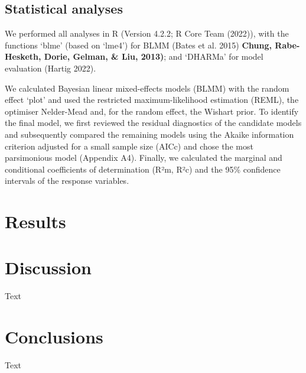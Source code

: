 \documentclass[
]{article}
\begin{document}
\hypertarget{statistical-analyses}{%
\subsection*{Statistical analyses}\label{statistical-analyses}}

We performed all analyses in R (Version 4.2.2; R Core Team (2022)), with the functions `blme' (based on `lme4') for BLMM (Bates et al. 2015) \textbf{Chung, Rabe-Hesketh, Dorie, Gelman, \& Liu, 2013)}; and `DHARMa' for model evaluation (Hartig 2022).

We calculated Bayesian linear mixed-effects models (BLMM) with the random effect `plot' and used the restricted maximum-likelihood estimation (REML), the optimiser Nelder-Mead and, for the random effect, the Wishart prior. To identify the final model, we first reviewed the residual diagnostics of the candidate models and subsequently compared the remaining models using the Akaike information criterion adjusted for a small sample size (AICc) and chose the most parsimonious model (Appendix A4). Finally, we calculated the marginal and conditional coefficients of determination (R²m, R²c) and the 95\% confidence intervals of the response variables.

\clearpage

\newpage

\hypertarget{results}{%
\section{Results}\label{results}}

\clearpage

\newpage

\hypertarget{discussion}{%
\section{Discussion}\label{discussion}}

Text

\clearpage

\newpage

\hypertarget{conclusions}{%
\section{Conclusions}\label{conclusions}}

Text

\clearpage

\newpage
\end{document}
